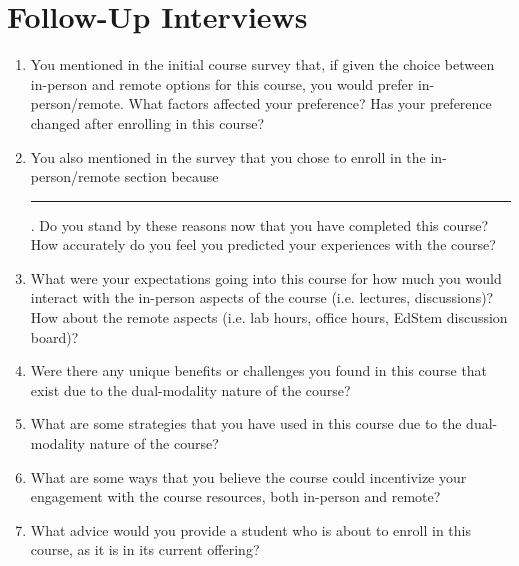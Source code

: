 \chapter{Follow-Up Interviews}\label{sec:appendix_d}

\begin{enumerate}
    \item You mentioned in the initial course survey that, if given the choice between in-person and remote options for this course, you would prefer in-person/remote. What factors affected your preference? Has your preference changed after enrolling in this course?
    \item You also mentioned in the survey that you chose to enroll in the in-person/remote section because \rule{1cm}{0.15mm}. Do you stand by these reasons now that you have completed this course? How accurately do you feel you predicted your experiences with the course?
    \item What were your expectations going into this course for how much you would interact with the in-person aspects of the course (i.e. lectures, discussions)? How about the remote aspects (i.e. lab hours, office hours, EdStem discussion board)?
    \item Were there any unique benefits or challenges you found in this course that exist due to the dual-modality nature of the course?
    \item What are some strategies that you have used in this course due to the dual-modality nature of the course?
    \item What are some ways that you believe the course could incentivize your engagement with the course resources, both in-person and remote?
    \item What advice would you provide a student who is about to enroll in this course, as it is in its current offering?
\end{enumerate}